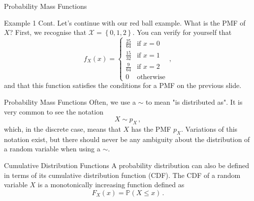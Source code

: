 \documentclass[10pt]{beamer}
\begin{document}
\begin{frame}[fragile]{Probability Mass Functions}
\begin{exampleblock}{Example 1 Cont.}
Let's continue with our red ball example. What is the PMF of \(X\)? First, we recognise that \(\mathcal{X} = \left\{0, 1, 2\right\}\). You can verify for yourself that
\begin{equation*}
    f_X\left(x\right) =
    \begin{cases}
        \frac{25}{64} & \text{if } x = 0\\
        \frac{15}{32} & \text{if } x = 1\\
        \frac{9}{64} & \text{if } x = 2\\
        0 & \text{otherwise}
    \end{cases}\,,
\end{equation*}
and that this function satisfies the conditions for a PMF on the previous slide.
\end{exampleblock}
\end{frame}

\begin{frame}[fragile]{Probability Mass Functions}
Often, we use a \(\sim\) to mean "is distributed as". It is very common to see the notation
\begin{equation*}
    X \sim p_X\,,
\end{equation*}
which, in the discrete case, means that \(X\) has the PMF \(p_X\). Variations of this notation exist, but there should never be any ambiguity about the distribution of a random variable when using a \(\sim\).

\end{frame}

\begin{frame}[fragile]{Cumulative Distribution Functions}
A probability distribution can also be defined in terms of its cumulative distribution function (CDF). The CDF of a random variable \(X\) is a monotonically increasing function defined as
\begin{equation*}
    F_X\left(x\right) = \mathbb{P}\left(X \leq x\right)\,.
\end{equation*}
\end{frame}
\end{document}
